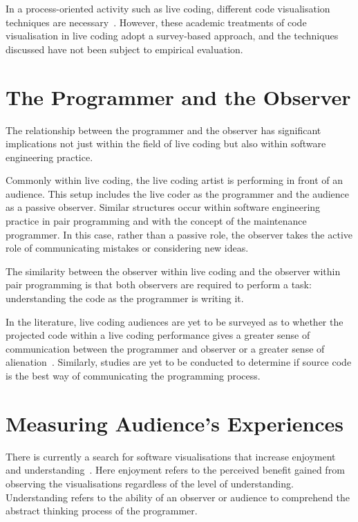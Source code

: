 
In a process-oriented activity such as live coding, different code visualisation techniques are necessary~\cite{McLean2010a,Magnusson2013}. However, these academic treatments of code visualisation in live coding adopt a survey-based approach, and the techniques discussed have not been subject to empirical evaluation.

\section{The Programmer and the Observer}

The relationship between the programmer and the observer has significant implications not just within the field of live coding but also within software engineering practice.

Commonly within live coding, the live coding artist is performing in front of an audience. This setup includes the live coder as the programmer and the audience as a passive observer. Similar structures occur within software engineering practice in pair programming and with the concept of the maintenance programmer. In this case, rather than a passive role, the observer takes the active role of communicating mistakes or considering new ideas.

The similarity between the observer within live coding and the observer within pair programming is that both observers are required to perform a task: understanding the code as the programmer is writing it.

In the literature, live coding audiences are yet to be surveyed as to whether the projected code within a live coding performance gives a greater sense of communication between the programmer and observer or a greater sense of alienation~\cite{Mclean2011}. Similarly, studies are yet to be conducted to determine if source code is the best way of communicating the programming process.

\section{Measuring Audience's Experiences}

There is currently a search for software visualisations that increase enjoyment and understanding~\cite{McLean2010a}. Here enjoyment refers to the perceived benefit gained from observing the visualisations regardless of the level of understanding. Understanding refers to the ability of an observer or audience to comprehend the abstract thinking process of the programmer.

